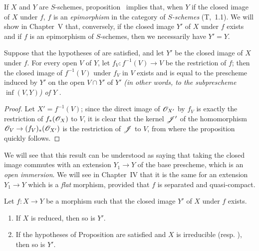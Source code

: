 \begin{rmk}[9.5.7]
\label{1.9.5.7}
If $X$ and $Y$ are $S$-schemes, proposition~ implies that, when $Y$ if the closed image of $X$ under $f$, $f$ is an \emph{epimorphism} in the category of \emph{$S$-schemes} (T,~1.1).
We will show in Chapter~V that, conversely, if the closed image $Y'$ of $X$ under $f$ exists and if $f$ is an epimorphism of $S$-schemes, then we necessarily have $Y'=Y$.
\end{rmk}

\begin{prop}[9.5.8]
\label{1.9.5.8}
Suppose that the hypotheses of  are satisfied, and let $Y'$ be the closed image of $X$ under $f$.
For every open $V$ of $Y$, let $f_V:f^{-1}(V)\to V$ be the restriction of $f$; then the closed image of $f^{-1}(V)$ under $f_V$ in $V$ exists and is equal to the prescheme induced by $Y'$ on the open $V\cap Y'$ of $Y'$ \emph{(in other words, to the subprescheme $\inf(V,Y)$) of $Y$ }.
\end{prop}

\begin{proof}
\label{proof-1.9.5.8}
Let $X'=f^{-1}(V)$; since the direct image of $\mathscr{O}_{X'}$ by $f_V$ is exactly the restriction of $f_*(\mathscr{O}_X)$ to $V$, it is clear that the kernel $\mathscr{J}'$ of the homomorphism $\OO_V\to(f_V)_*(\OO_{X'})$ is the restriction of $\mathscr{J}$ to $V$, from where the proposition quickly follows.
\end{proof}

We will see that this result can be understood as saying that taking the closed image commutes with an extension $Y_1\to Y$ of the base prescheme, which is an \emph{open immersion}.
We will see in Chapter~IV that it is the same for an extension $Y_1\to Y$ which is a \emph{flat} morphism, provided that $f$ is separated and quasi-compact.

\begin{prop}[9.5.9]
\label{1.9.5.9}
Let $f:X\to Y$ be a morphism such that the closed image $Y'$ of $X$ under $f$ exists.
\begin{enumerate}[label=\emph{(\roman*)}]
  \item If $X$ is reduced, then so is $Y'$.
  \item If the hypotheses of Proposition  are satisfied and $X$ is irreducible (resp. ), then so is $Y'$.
\end{enumerate}
\end{prop}

